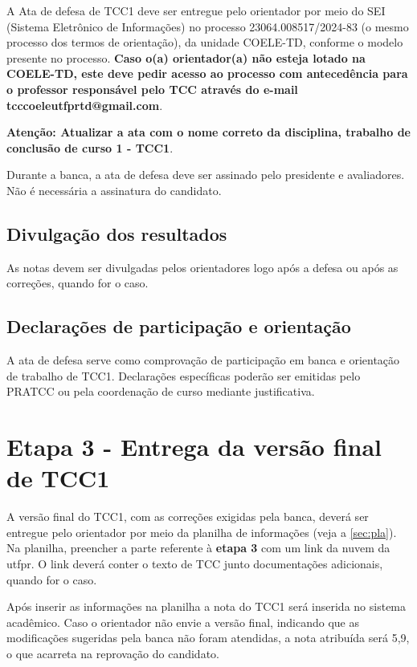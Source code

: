\documentclass[a4paper, 12pt]{article}
\newcommand{\seiprocess}{23064.008517/2024-83} %
\begin{document}
	A Ata de defesa de TCC1 deve ser entregue pelo orientador por meio do SEI (Sistema Eletrônico de Informações) no processo \seiprocess{} (o mesmo processo dos termos de orientação), da unidade COELE-TD, conforme o modelo presente no processo. \textbf{Caso o(a) orientador(a) não esteja lotado na COELE-TD, este deve pedir acesso ao processo com antecedência para o professor responsável pelo TCC através do e-mail tcccoeleutfprtd@gmail.com}.

	\textbf{Atenção: Atualizar a ata com o nome correto da disciplina, trabalho de conclusão de curso 1 - TCC1}.

	Durante a banca, a ata de defesa deve ser assinado pelo presidente e avaliadores. Não é necessária a assinatura do candidato.	
	
	\subsection{Divulgação dos resultados}
	
	As notas devem ser divulgadas pelos orientadores logo após a defesa ou após as correções, quando for o caso.

	\subsection{Declarações de participação e orientação}

	A ata de defesa serve como comprovação de participação em banca e orientação de trabalho de TCC1. Declarações específicas poderão ser emitidas pelo PRATCC ou pela coordenação de curso mediante justificativa.	
		
	\section{Etapa 3 - Entrega da versão final de TCC1}	
		
	A versão final do TCC1, com as correções exigidas pela banca, deverá ser entregue pelo orientador por meio da planilha de informações (veja a \autoref{sec:pla}). Na planilha, preencher a parte referente à \textbf{etapa 3} com um link da nuvem da utfpr. O link deverá conter o texto de TCC junto documentações adicionais, quando for o caso.	
			
	Após inserir as informações na planilha a nota do TCC1 será inserida no sistema acadêmico. Caso o orientador não envie a versão final, indicando que as modificações sugeridas pela banca não foram atendidas, a nota atribuída será 5,9, o que acarreta na reprovação do candidato.
\end{document}
